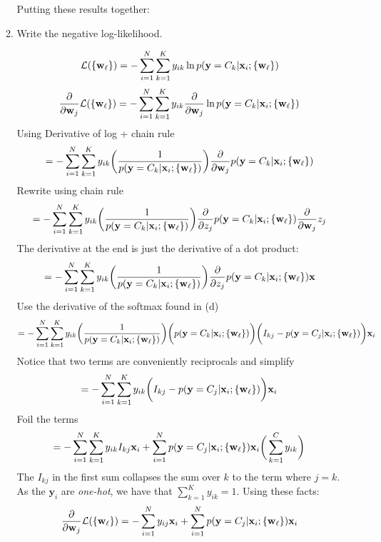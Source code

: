 \documentclass[12pt,letterpaper]{article}
\begin{document}
\begin{enumerate}
\begin{enumerate}
            Putting these results together:
            
            
            \item  Write the negative log-likelihood.
            
            $$
            \mathcal{L}(\{\mathbf{w}_{\ell}\}) = -\sum_{i=1}^N\sum_{k=1}^K y_{ik} \ln p(\mathbf{y} = C_k | \mathbf{x}_i; \{\mathbf{w}_\ell\})
            $$
            $$\frac{\partial }{\partial \mathbf{w}_j} \mathcal{L}(\{\mathbf{w}_{\ell}\}) =-\sum_{i=1}^N\sum_{k=1}^K y_{ik}\frac{\partial }{\partial \mathbf{w}_j} \ln p(\mathbf{y} = C_k | \mathbf{x}_i; \{\mathbf{w}_\ell\})
            $$
            \noindent Using Derivative of log + chain rule
            $$=-\sum_{i=1}^N\sum_{k=1}^K y_{ik}\bigg(\frac{1}{p(\mathbf{y} = C_k | \mathbf{x}_i; \{\mathbf{w}_\ell\})}\bigg)\frac{\partial }{\partial \mathbf{w}_j}p(\mathbf{y} = C_k | \mathbf{x}_i; \{\mathbf{w}_\ell\})$$
            \noindent Rewrite using chain rule
            $$ =-\sum_{i=1}^N\sum_{k=1}^K y_{ik}\bigg(\frac{1}{p(\mathbf{y} = C_k | \mathbf{x}_i; \{\mathbf{w}_\ell\})}\bigg)
               \frac{\partial }{\partial z_j} p(\mathbf{y} = C_k | \mathbf{x}_i; \{\mathbf{w}_\ell\}) \frac{\partial }{\partial \mathbf{w}_j} z_j$$
            The derivative at the end is just the derivative of a dot product:
            $$ =-\sum_{i=1}^N\sum_{k=1}^K y_{ik}\bigg(\frac{1}{p(\mathbf{y} = C_k | \mathbf{x}_i; \{\mathbf{w}_\ell\})}\bigg)
               \frac{\partial }{\partial z_j} p(\mathbf{y} = C_k | \mathbf{x}_i; \{\mathbf{w}_\ell\}) \mathbf{x}$$
            Use the derivative of the softmax found in (d)
            $$ = -\sum_{i=1}^N\sum_{k=1}^K y_{ik}\bigg(\frac{1}{p(\mathbf{y} = C_k | \mathbf{x}_i; \{\mathbf{w}_\ell\})}\bigg)
            \bigg(p(\mathbf{y} = C_k | \mathbf{x}_i; \{\mathbf{w}_\ell\})\bigg)\bigg(I_{kj} - p(\mathbf{y} = C_j | \mathbf{x}_i; \{\mathbf{w}_\ell\})\bigg) \mathbf{x}_i$$
            Notice that two terms are conveniently reciprocals and simplify
        $$= -\sum_{i=1}^N\sum_{k=1}^K y_{ik}\bigg(I_{kj} - p(\mathbf{y} = C_j | \mathbf{x}_i; \{\mathbf{w}_\ell\})\bigg)\mathbf{x}_i$$
        Foil the terms
        $$= -\sum_{i=1}^N\sum_{k=1}^K y_{ik}I_{kj}\mathbf{x}_i + \sum_{i=1}^N p(\mathbf{y} = C_j | \mathbf{x}_i; \{\mathbf{w}_\ell\})\mathbf{x}_i \bigg(\sum_{k=1}^C y_{ik}
        \bigg)$$
        The $I_{kj}$ in the first sum collapses the sum over $k$ to the term where $j=k$. As the $\mathbf{y}_{i}$ are \textit{one-hot}, 
        we have that $\sum_{k=1}^K y_{ik}=1$. Using these facts:
        $$ \frac{\partial }{\partial \mathbf{w}_j} \mathcal{L}(\{\mathbf{w}_{\ell}\}) = -\sum_{i=1}^N y_{ij}\mathbf{x}_i + \sum_{i=1}^N p(\mathbf{y} = C_j | \mathbf{x}_i; \{\mathbf{w}_\ell\})\mathbf{x}_i $$
        

\end{enumerate}
\end{enumerate}
\end{document}
